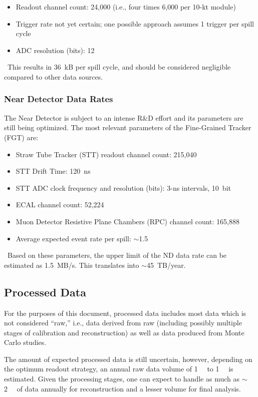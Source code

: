 \begin{itemize}
\item Readout channel count: 24,000 (i.e., four times 6,000 per 10-kt module)
\item Trigger rate not yet certain; %
one possible approach assumes 1 trigger per spill cycle
\item ADC resolution (bits): 12
\end{itemize}
\
This results in 36~kB per spill cycle, and should be considered negligible %
compared to other data sources.

\subsubsection{Near Detector Data Rates}
The Near Detector is subject to an intense R\&D effort and its
parameters are still being optimized.%
The most relevant parameters
of the Fine-Grained Tracker (FGT) are:
\begin{itemize}
\item   Straw Tube Tracker (STT) readout channel count: 215,040
\item STT Drift Time: 120~ns
\item STT ADC clock frequency and resolution (bits): 3-ns intervals, 10~bit
\item ECAL channel count: 52,224
\item Muon Detector Resistive Plane Chambers (RPC) channel count: 165,888
\item Average expected event rate per spill: $\sim$1.5
\end{itemize}
\
Based on these parameters, the upper limit of the ND data rate can be estimated as 1.5~MB/s. This translates into $\sim$45~TB/year. 

\subsection{Processed Data}
\label{sec:detectors-sc-infrastructure-processed-data}
For the purposes of this document, processed data %
includes most data which is not considered ``raw,'' i.e., data derived from raw (including possibly multiple stages
of calibration and reconstruction) as well as data produced from Monte Carlo studies.

The amount of expected processed data is still uncertain, however, 
depending on the optimum readout strategy, an annual raw data volume of
\SI{1}{\tera\byte} to \SI{1}{\peta\byte} %
is estimated. 
Given the processing stages, one can expect %
to handle as much as $\sim$\SI{2}{\peta\byte} of data annually for reconstruction and a lesser
volume for final analysis. %

